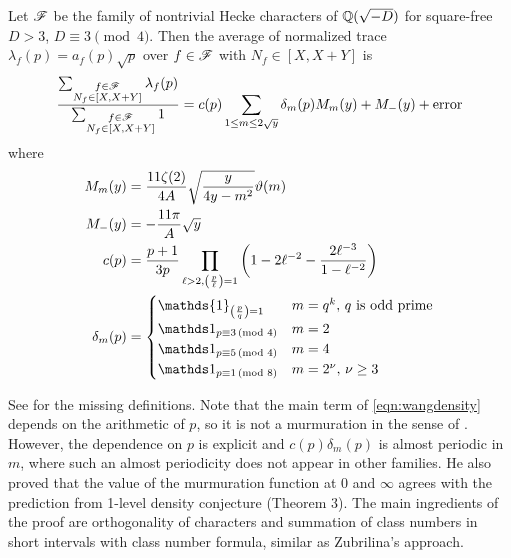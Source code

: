 \begin{theorem}
    Let $\mathscr{F}$ be the family of nontrivial Hecke characters of $\mathbb{Q}(\sqrt{-D})$ for square-free $D > 3$, $D \equiv 3 \pmod{4}$.
    Then the average of normalized trace $\lambda_f(p) = a_f(p) \sqrt{p}$ over $f \in \mathscr{F}$ with $N_f \in [X, X + Y]$ is
    \begin{equation}
        \label{eqn:wangdensity}
        \frac{\sum_{\substack{f \in \mathscr{F} \\ N_f \in [X, X + Y]}} \lambda_f(p)}{\sum_{\substack{f \in \mathscr{F} \\ N_f \in [X, X + Y]}} 1} = c(p) \sum_{1 \le m \le 2 \sqrt{y}} \delta_m(p) M_m(y) + M_-(y) + \text{error}
    \end{equation}
    where
    \begin{align*}
        M_m(y) &= \frac{11\zeta(2)}{4A} \sqrt{\frac{y}{4y - m^2}} \vartheta(m)\\
        M_-(y) &= -\frac{11\pi}{A} \sqrt{y}\\
        c(p) &= \frac{p+1}{3p} \prod_{\ell > 2, \left(\frac{p}{\ell}\right) = 1} \left(1 - 2 \ell^{-2} - \frac{2 \ell^{-3}}{1 - \ell^{-2}}\right) \\
        \delta_m(p) &= \begin{cases}
            \mathds{1}_{\left(\frac{p}{q}\right) = 1} & m = q^k, \,q\text{ is odd prime} \\
            \1_{p \equiv 3 \Mod{4}} & m = 2 \\
            \1_{p \equiv 5 \Mod{4}} & m = 4 \\
            \1_{p \equiv 1 \Mod{8}} & m = 2^\nu, \,\nu \ge 3
        \end{cases}
    \end{align*}
\end{theorem}
See \cite[Theorem 1]{wang2025murmurations} for the missing definitions.
Note that the main term of \eqref{eqn:wangdensity} depends on the arithmetic of $p$, so it is not a murmuration in the sense of \cite{sarnak}.
However, the dependence on $p$ is explicit and $c(p) \delta_m(p)$ is almost periodic in $m$, where such an almost periodicity does not appear in other families.
He also proved that the value of the murmuration function at 0 and $\infty$ agrees with the prediction from 1-level density conjecture (Theorem 3).
The main ingredients of the proof are orthogonality of characters and summation of class numbers in short intervals with class number formula, similar as Zubrilina's approach.

